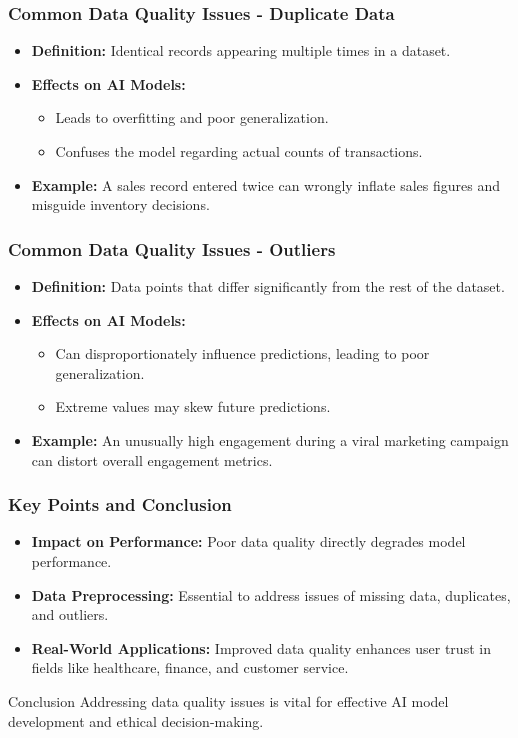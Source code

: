 \documentclass[aspectratio=169]{beamer}
\begin{document}
\begin{frame}[fragile]
    \frametitle{Common Data Quality Issues - Duplicate Data}
    \begin{itemize}
        \item \textbf{Definition:} Identical records appearing multiple times in a dataset.
        \item \textbf{Effects on AI Models:}
        \begin{itemize}
            \item Leads to overfitting and poor generalization.
            \item Confuses the model regarding actual counts of transactions.
        \end{itemize}
        \item \textbf{Example:} A sales record entered twice can wrongly inflate sales figures and misguide inventory decisions.
    \end{itemize}
\end{frame}

\begin{frame}[fragile]
    \frametitle{Common Data Quality Issues - Outliers}
    \begin{itemize}
        \item \textbf{Definition:} Data points that differ significantly from the rest of the dataset.
        \item \textbf{Effects on AI Models:}
        \begin{itemize}
            \item Can disproportionately influence predictions, leading to poor generalization.
            \item Extreme values may skew future predictions.
        \end{itemize}
        \item \textbf{Example:} An unusually high engagement during a viral marketing campaign can distort overall engagement metrics.
    \end{itemize}
\end{frame}

\begin{frame}[fragile]
    \frametitle{Key Points and Conclusion}
    \begin{itemize}
        \item \textbf{Impact on Performance:} Poor data quality directly degrades model performance.
        \item \textbf{Data Preprocessing:} Essential to address issues of missing data, duplicates, and outliers.
        \item \textbf{Real-World Applications:} Improved data quality enhances user trust in fields like healthcare, finance, and customer service.
    \end{itemize}
    \begin{block}{Conclusion}
        Addressing data quality issues is vital for effective AI model development and ethical decision-making.
    \end{block}
\end{frame}
\end{document}
